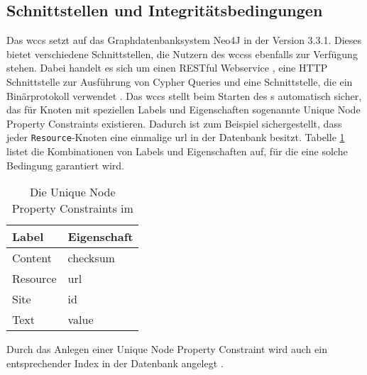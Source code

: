 \subsection{Schnittstellen und Integritätsbedingungen}
    \label{section:solutionDetailsPersistenceDatabse}
    Das \gls{wccs} setzt auf das Graphdatenbanksystem Neo4J in der Version 3.3.1.
    Dieses bietet verschiedene Schnittstellen, die Nutzern des \glspl{wccs} ebenfalls zur Verfügung stehen.
    Dabei handelt es sich um einen RESTful Webservice \cite{neo4j:restDocumentation},
    eine HTTP Schnittstelle zur Ausführung von Cypher Queries \cite[Kapitel 5]{neo4j:documentation}
    und eine Schnittstelle, die ein Binärprotokoll verwendet \cite[Kapitel 4]{neo4j:documentation}.
    Das \gls{wccs} stellt beim Starten des {\classificationStorage}s automatisch sicher,
    das für Knoten mit speziellen Labels und Eigenschaften sogenannte
    Unique Node Property Constraints
    \cite[Kapitel 3.5.2.2]{neo4j:documentation} existieren.
    Dadurch ist zum Beispiel sichergestellt,
    dass jeder \texttt{Resource}-Knoten eine einmalige \gls{url} in der Datenbank besitzt.
    Tabelle \ref{table:solutionDetailsPersistenceDatabaseConstraints}
    listet die Kombinationen von Labels und Eigenschaften auf,
    für die eine solche Bedingung garantiert wird.

    \begin{table}[htb]
        \centering
        \begin{tabular}{|l|l|}
            \hline
            \textbf{Label} & \textbf{Eigenschaft} \\ \hline
            Content        & checksum             \\ \hline
            Resource       & url                  \\ \hline
            Site           & id                   \\ \hline
            Text           & value                \\ \hline
        \end{tabular}
        \caption{Die Unique Node Property Constraints im {\classificationStorage}}
        \label{table:solutionDetailsPersistenceDatabaseConstraints}
    \end{table}

    Durch das Anlegen einer Unique Node Property Constraint wird auch ein entsprechender Index in der Datenbank angelegt
    \cite[Kapitel 3.5.2.2]{neo4j:documentation}. 
